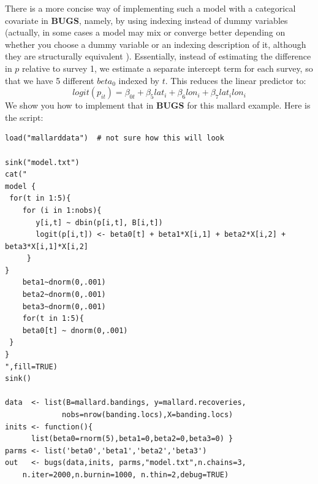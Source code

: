 There is a more concise way of implementing such a model with a categorical covariate in {\bf BUGS}, namely, by using indexing instead of dummy variables (actually, in some cases a model may mix or converge better depending on whether you choose a dummy variable or an indexing description of it, although they are structurally equivalent \citep{kery:2010}). Essentially, instead of estimating the difference in $p$ relative to survey 1, we  estimate a separate intercept term for each survey, so that we have 5 different $beta_0$ indexed by $t$. This reduces the linear predictor to:
\[
logit(p_{it}) = \beta_{0t} +  \beta_5 lat_i + \beta_6 lon_i + \beta_7 lat_i lon_i
\]
We show you how to implement that in {\bf BUGS} for this mallard example. Here is the script:

{\small
\begin{verbatim}
load("mallarddata")  # not sure how this will look

sink("model.txt")
cat("
model {
 for(t in 1:5){
    for (i in 1:nobs){
       y[i,t] ~ dbin(p[i,t], B[i,t])
       logit(p[i,t]) <- beta0[t] + beta1*X[i,1] + beta2*X[i,2] + beta3*X[i,1]*X[i,2]
     }
}
	beta1~dnorm(0,.001)
	beta2~dnorm(0,.001)
	beta3~dnorm(0,.001)
	for(t in 1:5){
 	beta0[t] ~ dnorm(0,.001)
 }
}
",fill=TRUE)
sink()

data  <- list(B=mallard.bandings, y=mallard.recoveries,
             nobs=nrow(banding.locs),X=banding.locs)
inits <- function(){
      list(beta0=rnorm(5),beta1=0,beta2=0,beta3=0) }
parms <- list('beta0','beta1','beta2','beta3')
out   <- bugs(data,inits, parms,"model.txt",n.chains=3,
 	n.iter=2000,n.burnin=1000, n.thin=2,debug=TRUE)
\end{verbatim}
}

